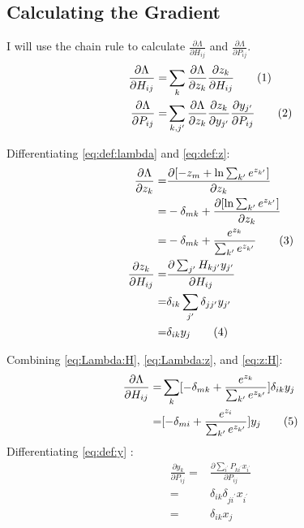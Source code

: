 \documentclass[]{article}
\newcommand\numberthis{\addtocounter{equation}{1}\tag{\theequation}}
\begin{document}
\subsection{Calculating the Gradient}

I will use the chain rule to calculate $\frac{\partial{\Lambda}}{\partial H_{ij}}$ and $\frac{\partial{\Lambda}}{\partial P_{ij}}$.
\begin{align*}
	\frac{\partial{\Lambda}}{\partial H_{ij}} =& \sum_k \frac{\partial{\Lambda}}{\partial z_k}\frac{\partial z_k}{\partial H_{ij}} \numberthis \label{eq:Lambda:H}\\
	\frac{\partial{\Lambda}}{\partial P_{ij}} =&\sum_{k,j^{\prime}} \frac{\partial{\Lambda}}{\partial z_k} \frac{\partial z_k}{\partial y_{j^{\prime}}} \frac{\partial y_{j^{\prime}}}{\partial P_{ij}} \numberthis \label{eq:Lambda:P}
\end{align*}

Differentiating \eqref{eq:def:lambda} and \eqref{eq:def:z}:
\begin{align*}
	\frac{\partial \Lambda}{\partial z_k} =& \frac{\partial [-z_m +  \ln \sum_{k^{\prime}} e^{z_{k^{\prime}}}]}{\partial z_k}\\
	=& - \delta_{mk} + \frac{\partial [\ln \sum_{k^{\prime}} e^{z_{k^{\prime}}}]}{\partial z_k}\\
	=& - \delta_{mk} + \frac{e^{z_k}}{\sum_{k^{\prime}} e^{z_{k^{\prime}}}} \numberthis \label{eq:Lambda:z}\\
	\frac{\partial z_k}{\partial H_{ij}} =& \frac{ \partial \sum_{j^{\prime}} H_{k{j^{\prime}}} y_{j^{\prime}}}{\partial H_{ij}}\\
	=& \delta_{ik} \sum_{j^{\prime}} \delta_{j{j^{\prime}}} y_{j^{\prime}}\\
	=& \delta_{ik} y_j \numberthis \label{eq:z:H}\\
\end{align*}

Combining \eqref{eq:Lambda:H}, \eqref{eq:Lambda:z}, and \eqref{eq:z:H}:
\begin{align*}
	\frac{\partial{\Lambda}}{\partial H_{ij}} =& \sum_k  [-\delta_{mk} + \frac{e^{z_k}}{\sum_{k^{\prime}} e^{z_{k^{\prime}}}} ] \delta_{ik} y_j\\
	=& [-\delta_{mi} + \frac{e^{z_i}}{\sum_{k^{\prime}} e^{z_{k^{\prime}}}} ]  y_j   \numberthis \label{eq:Lambda:HH}
\end{align*}
Differentiating \eqref{eq:def:y} :
\begin{align*}
	\frac{\partial y_k}{\partial P_{ij}} =&\frac{\partial \sum_{i^{\prime}} P_{k{i^{\prime}}} x_{i^{\prime}}}{\partial P_{ij}}\\
	=& \delta_{ik} \delta_{j{i^{\prime}}} x_{{i^{\prime}}}\\
	=& \delta_{ik} x_j
\end{align*}
\end{document}
